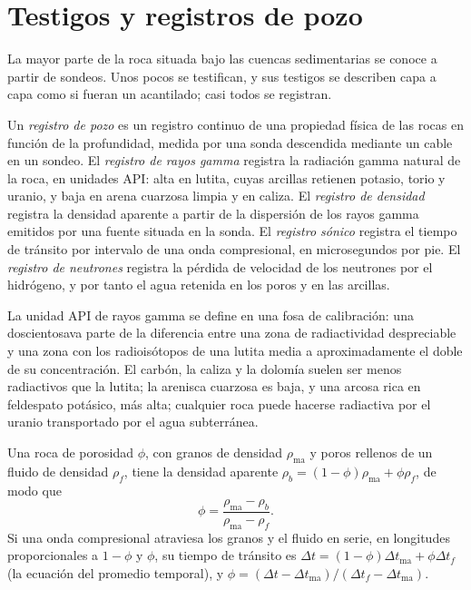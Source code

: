 \section{Testigos y registros de pozo}\label{sec:b3:facies-models:logs}

La mayor parte de la roca situada bajo las cuencas sedimentarias se conoce a partir de sondeos. Unos pocos
se testifican, y sus testigos se describen capa a capa como si fueran un acantilado; casi todos
se registran.

\begin{definition}\label{def:b3:facies-models:wireline}
Un \emph{registro de pozo} es un registro continuo de una
propiedad física de las rocas en función de la profundidad, medida por una sonda descendida
mediante un cable en un sondeo. El \emph{registro de rayos gamma}
registra la radiación gamma natural de la roca, en unidades API: alta en
lutita, cuyas arcillas retienen potasio, torio y uranio, y baja en
arena cuarzosa limpia y en caliza. El \emph{registro de densidad}
registra la densidad aparente a partir de la dispersión de los rayos gamma emitidos por una
fuente situada en la sonda. El \emph{registro sónico} registra el
tiempo de tránsito por intervalo de una onda compresional, en microsegundos por pie. El
\emph{registro de neutrones} registra la pérdida de velocidad de los neutrones
por el hidrógeno, y por tanto el agua retenida en los poros y en las arcillas.
\end{definition}

La unidad API de rayos gamma se define en una fosa de calibración: una doscientosava parte de la
diferencia entre una zona de radiactividad despreciable y una zona con
los radioisótopos de una lutita media a aproximadamente el doble de su concentración. El carbón,
la caliza y la dolomía suelen ser menos radiactivos que la lutita; la arenisca cuarzosa es baja, y una
arcosa rica en feldespato potásico, más alta; cualquier roca puede hacerse radiactiva por el uranio
transportado por el agua subterránea.

\begin{proposition}\label{prop:b3:facies-models:porosity}
Una roca de porosidad $\phi$, con granos de densidad $\rho_{\mathrm{ma}}$ y
poros rellenos de un fluido de densidad $\rho_f$, tiene la densidad aparente
$\rho_b = (1 - \phi)\rho_{\mathrm{ma}} + \phi\rho_f$, de modo que
\[
\phi = \frac{\rho_{\mathrm{ma}} - \rho_b}{\rho_{\mathrm{ma}} - \rho_f}.
\]
Si una onda compresional atraviesa los granos y el fluido en serie, en
longitudes proporcionales a $1 - \phi$ y $\phi$, su tiempo de tránsito es
$\Delta t = (1 - \phi)\Delta t_{\mathrm{ma}} + \phi\Delta t_f$ (la
ecuación del promedio temporal), y $\phi = (\Delta t - \Delta
t_{\mathrm{ma}})/(\Delta t_f - \Delta t_{\mathrm{ma}})$.
\end{proposition}

